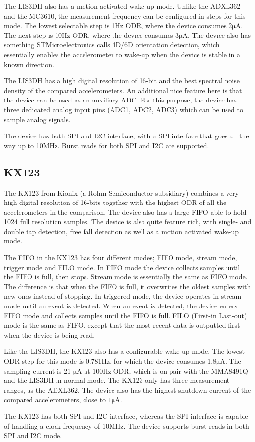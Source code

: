The LIS3DH also has a motion activated wake-up mode. Unlike the ADXL362 and the MC3610, the measurement frequency can be configured in steps for this mode. The lowest selectable step is 1Hz ODR, where the device consumes 2$\si{\micro\ampere}$. The next step is 10Hz ODR, where the device consumes 3$\si{\micro\ampere}$. The device also has something STMicroelectronics calls 4D/6D orientation detection, which essentially enables the accelerometer to wake-up when the device is stable in a known direction. 

The LIS3DH has a high digital resolution of 16-bit and the best spectral noise density of the compared accelerometers. An additional nice feature here is that the device can be used as an auxiliary ADC. For this purpose, the device has three dedicated analog input pins (ADC1, ADC2, ADC3) which can be used to sample analog signals. 

The device has both SPI and I2C interface, with a SPI interface that goes all the way up to 10MHz. Burst reads for both SPI and I2C are supported.

\subsection{KX123}

The KX123 from Kionix (a Rohm Semiconductor subsidiary) combines a very high digital resolution of 16-bits together with the highest ODR of all the accelerometers in the comparison. The device also has a large FIFO able to hold 1024 full resolution samples. The device is also quite feature rich, with single- and double tap detection, free fall detection as well as a motion activated wake-up mode.

The FIFO in the KX123 has four different modes; FIFO mode, stream mode, trigger mode and FILO mode. In FIFO mode the device collects samples until the FIFO is full, then stops. Stream mode is essentially the same as FIFO mode. The difference is that when the FIFO is full, it overwrites the oldest samples with new ones instead of stopping. In triggered mode, the device operates in stream mode until an event is detected. When an event is detected, the device enters FIFO mode and collects samples until the FIFO is full. FILO (First-in Last-out) mode is the same as FIFO, except that the most recent data is outputted first when the device is being read.

Like the LIS3DH, the KX123 also has a configurable wake-up mode. The lowest ODR step for this mode is 0.781Hz, for which the device consumes 1.8$\si{\micro\ampere}$. The sampling current is 21 $\si{\micro\ampere}$ at 100Hz ODR, which is on pair with the MMA8491Q and the LIS3DH in normal mode. The KX123 only has three measurement ranges, as the ADXL362. The device also has the highest shutdown current of the compared accelerometers, close to $1\si{\micro\ampere}$. 

The KX123 has both SPI and I2C interface, whereas the SPI interface is capable of handling a clock frequency of 10MHz. The device supports burst reads in both SPI and I2C mode.